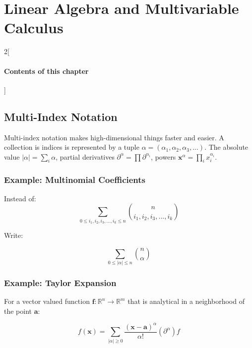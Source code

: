 \chapter{Linear Algebra and Multivariable Calculus}

\begin{multicols}{2}[\subsubsection*{Contents of this chapter}]
\end{multicols}



\section{Multi-Index Notation}
Multi-index notation makes high-dimensional things faster and easier. A collection is indices is represented by a tuple $\alpha = \left(\alpha_1,\alpha_2,\alpha_3,... \right)$. The absolute value $|\alpha| = \sum_i \alpha$, partial derivatives $\partial^\alpha = \prod \partial^{\alpha_i}$, powers $\mathbf{x}^\alpha = \prod_i x_i^{\alpha_i}$.

\subsection{Example: Multinomial Coefficients}	

Instead of:
\begin{equation}
\sum_{0\leq i_1,i_2,i_3,...,i_k \leq n} {n \choose i_1,i_2,i_3,...,i_k} 
\end{equation}

Write:

\begin{equation}	
\sum_{0\leq |\alpha|\leq n}{n \choose \alpha}
\end{equation}

\subsection{Example: Taylor Expansion}

For a vector valued function $\mathbf{f}: \mathbb{R}^n \rightarrow \mathbb{R}^m$ that is analytical in a neighborhood of the point $\mathbf{a}$:

\begin{equation}
f(\mathbf{x}) = \sum_{|\alpha|\geq0} \frac{(\mathbf{x} - \mathbf{a})^\alpha}{\alpha!}(\partial^\alpha)f
\end{equation}




